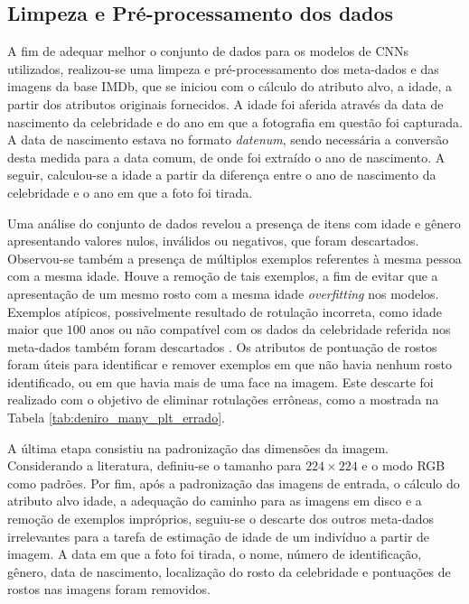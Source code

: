 \subsection{Limpeza e Pré-processamento dos dados}

A fim de adequar melhor o conjunto de dados para os modelos de CNNs utilizados, realizou-se uma limpeza e pré-processamento dos meta-dados e das imagens da base IMDb, que se iniciou com o cálculo do atributo alvo, a idade, a partir dos atributos originais fornecidos. A idade foi aferida através da data de nascimento da celebridade e do ano em que a fotografia em questão foi capturada. A data de nascimento estava no formato \emph{datenum}, sendo necessária a conversão desta medida para a data comum, de onde foi extraído o ano de nascimento. A seguir, calculou-se a idade a partir da diferença entre o ano de nascimento da celebridade e o ano em que a foto foi tirada.

Uma análise do conjunto de dados revelou a presença de itens com idade e gênero apresentando valores nulos, inválidos ou negativos, que foram descartados. Observou-se também a presença de múltiplos exemplos referentes à mesma pessoa com a mesma idade. Houve a remoção de tais exemplos, a fim de evitar que a apresentação de um mesmo rosto com a mesma idade \emph{overfitting} nos modelos. Exemplos atípicos, possivelmente resultado de rotulação incorreta, como idade maior que $100$ anos ou não compatível com os dados da celebridade referida nos meta-dados também foram descartados . Os atributos de pontuação de rostos foram úteis para identificar e remover exemplos em que não havia nenhum rosto identificado, ou em que havia mais de uma face na imagem. Este descarte foi realizado com o objetivo de eliminar rotulações errôneas, como a mostrada na Tabela \ref{tab:deniro_many_plt_errado}.

A última etapa consistiu na padronização das dimensões da imagem. Considerando a literatura, definiu-se o tamanho para $224 \times 224$ e o modo RGB como padrões. Por fim, após a padronização das imagens de entrada, o cálculo do atributo alvo idade, a adequação do caminho para as imagens em disco e a remoção de exemplos impróprios, seguiu-se o descarte dos outros meta-dados irrelevantes para a tarefa de estimação de idade de um indivíduo a partir de imagem. A data em que a foto foi tirada, o nome, número de identificação, gênero, data de nascimento, localização do rosto da celebridade e pontuações de rostos nas imagens foram removidos.

